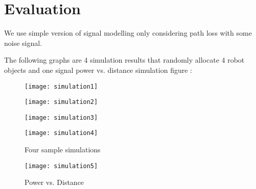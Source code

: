 \section{Evaluation}
\label{sec:evaluation}
\label{Simulation Result}
\indent 
	We use simple version of signal modelling only considering path loss with some noise signal. 
\par 
	The following graphs are 4 simulation results that randomly allocate 4 robot objects and one signal power vs. distance simulation figure :\\
 
\begin{figure}[h]
\begin{minipage}[h]{0.4\linewidth}
	\centering
	\texttt{[image: simulation1]}
	\end{minipage}
	
	\begin{minipage}[h]{0.4\linewidth}
	\centering
	\texttt{[image: simulation2]}
	\end{minipage}

	\begin{minipage}[h]{0.4\linewidth}
	\centering
	\texttt{[image: simulation3]}
	\end{minipage}
	
	\begin{minipage}[h]{0.4\linewidth}
	\centering
	\texttt{[image: simulation4]}
	\end{minipage}

\caption{Four sample simulations}

\begin{minipage}[h]{\linewidth}
	\centering
	\texttt{[image: simulation5]}
	\end{minipage}
	\caption{Power vs. Distance}
	
\label{fig:image2}
\end{figure}


